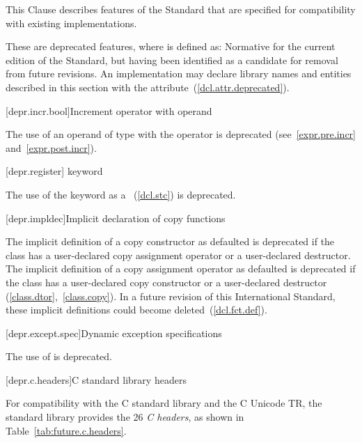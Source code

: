 
\pnum
This Clause describes features of the \Cpp Standard that are specified for compatibility with
existing implementations.

\pnum
These are deprecated features, where
is defined as:
Normative for the current edition of the Standard,
but having been identified as a candidate for removal from future revisions.
An implementation may declare library names and entities described in this section with the
 attribute~(\ref{dcl.attr.deprecated}).

[depr.incr.bool]{Increment operator with  operand}

\pnum
The use of an operand of type
with the
\tcode{++}
operator is deprecated (see~\ref{expr.pre.incr} and~\ref{expr.post.incr}).

[depr.register]{ keyword}

\pnum
The use of the  keyword as a
~(\ref{dcl.stc}) is deprecated.

[depr.impldec]{Implicit declaration of copy functions}

\pnum
The implicit definition of a copy constructor
as defaulted
is deprecated if the class has a
user-declared copy assignment operator or a user-declared destructor. The implicit
definition of a copy assignment operator
as defaulted is deprecated if the class has a user-declared
copy constructor or a user-declared destructor (\ref{class.dtor},~\ref{class.copy}).
In a future revision of this International Standard, these implicit definitions
could become deleted~(\ref{dcl.fct.def}).

[depr.except.spec]{Dynamic exception specifications}

\pnum
The use of  is deprecated.

[depr.c.headers]{C standard library headers}

\pnum
For compatibility with the 
%
C standard library and the C Unicode TR, the \Cpp standard library provides
the 26 \textit{C headers}, as shown in Table~\ref{tab:future.c.headers}.

